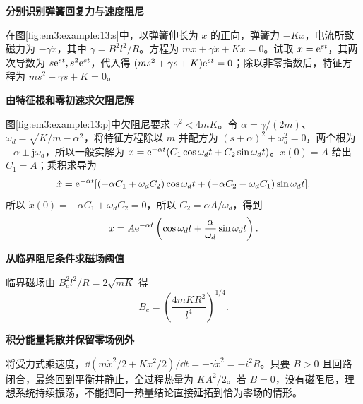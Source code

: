 \begin{solution}\textbf{分别识别弹簧回复力与速度阻尼}\par\nobreak
在图\ref{fig:em3:example:13:s}中，以弹簧伸长为 $x$ 的正向，弹簧力 $-Kx$，电流所致磁力为 $-\gamma\dot x$，其中 $\gamma=B^2l^2/R$。方程为 $m\ddot x+\gamma\dot x+Kx=0$。试取 $x=\mathrm e^{st}$，其两次导数为 $s\mathrm e^{st},s^2\mathrm e^{st}$，代入得 $(ms^2+\gamma s+K)\mathrm e^{st}=0$；除以非零指数后，特征方程为 $ms^2+\gamma s+K=0$。



\par\medskip{}\noindent\textbf{由特征根和零初速求欠阻尼解}\par\nobreak
图\ref{fig:em3:example:13:p}中欠阻尼要求 $\gamma^2<4mK$。令 $\alpha=\gamma/(2m)$、$\omega_d=\sqrt{K/m-\alpha^2}$，将特征方程除以 $m$ 并配方为 $(s+\alpha)^2+\omega_d^2=0$，两个根为 $-\alpha\pm\mathrm j\omega_d$，所以一般实解为 $x=\mathrm e^{-\alpha t}(C_1\cos\omega_dt+C_2\sin\omega_dt)$。$x(0)=A$ 给出 $C_1=A$；乘积求导为
\[
\dot x=\mathrm e^{-\alpha t}
[(-\alpha C_1+\omega_d C_2)\cos\omega_dt
+(-\alpha C_2-\omega_d C_1)\sin\omega_dt].
\]
所以 $\dot x(0)=-\alpha C_1+\omega_d C_2=0$，所以 $C_2=\alpha A/\omega_d$，得到
\[x=A\mathrm e^{-\alpha t}\left(\cos\omega_dt+\frac\alpha{\omega_d}\sin\omega_dt\right).\]


\par\medskip{}\noindent\textbf{从临界阻尼条件求磁场阈值}\par\nobreak
临界磁场由 $B_c^2l^2/R=2\sqrt{mK}$ 得
\[B_c=\left(\frac{4mKR^2}{l^4}\right)^{1/4}.\]


\par\medskip{}\noindent\textbf{积分能量耗散并保留零场例外}\par\nobreak
将受力式乘速度，$\dd(m\dot x^2/2+Kx^2/2)/\dd t=-\gamma\dot x^2=-i^2R$。只要 $B>0$ 且回路闭合，最终回到平衡并静止，全过程热量为 $KA^2/2$。若 $B=0$，没有磁阻尼，理想系统持续振荡，不能把同一热量结论直接延拓到恰为零场的情形。\end{solution}

